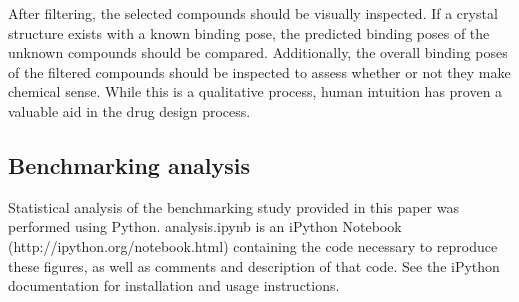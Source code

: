 After filtering, the selected compounds should be visually inspected. 
If a crystal structure exists with a known binding pose, the predicted binding poses of the unknown compounds should be compared. 
Additionally, the overall binding poses of the filtered compounds should be inspected to assess whether or not they make chemical sense. 
While this is a qualitative process, human intuition has proven a valuable aid in the drug design process. \citep{Voet:2014de}

\subsection{Benchmarking analysis}

Statistical analysis of the benchmarking study provided in this paper was performed using Python. 
analysis.ipynb is an iPython Notebook (http://ipython.org/notebook.html) containing the code necessary to reproduce these figures, as well as comments and description of that code.
See the iPython documentation for installation and usage instructions.


